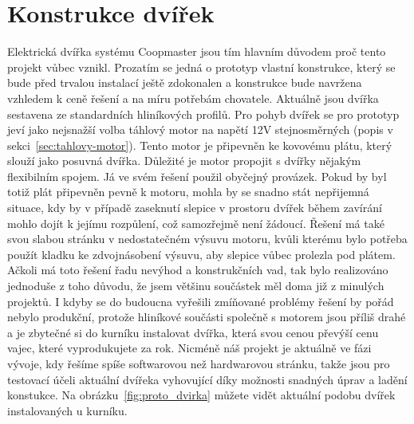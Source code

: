 \section{Konstrukce dvířek}\label{sec:konstrukce-dvirek}
Elektrická dvířka systému Coopmaster jsou tím hlavním důvodem proč tento projekt vůbec vznikl.
Prozatím se jedná o prototyp vlastní konstrukce, který se bude před trvalou instalací ještě zdokonalen a konstrukce bude navržena vzhledem k ceně řešení a na míru potřebám chovatele.
Aktuálně jsou dvířka sestavena ze standardních hliníkových profilů.
Pro pohyb dvířek se pro prototyp jeví jako nejsnažší volba táhlový motor na napětí 12V stejnosměrných (popis v sekci~\ref{sec:tahlovy-motor}).
Tento motor je připevněn ke kovovému plátu, který slouží jako posuvná dvířka.
Důležité je motor propojit s dvířky nějakým flexibilním spojem.
Já ve svém řešení použil obyčejný provázek.
Pokud by byl totiž plát připevněn pevně k motoru, mohla by se snadno stát nepřijemná situace, kdy by v případě zaseknutí slepice v prostoru dvířek během zavírání mohlo dojít k jejímu rozpůlení, což samozřejmě není žádoucí.
Řešení má také svou slabou stránku v nedostatečném výsuvu motoru, kvůli kterému bylo potřeba použít kladku ke zdvojnásobení výsuvu, aby slepice vůbec prolezla pod plátem.
Ačkoli má toto řešení řadu nevýhod a konstrukčních vad, tak bylo realizováno jednoduše z toho důvodu, že jsem většinu součástek měl doma již z minulých projektů.
I kdyby se do budoucna vyřešili zmíňované problémy řešení by pořád nebylo produkční, protože hliníkové součásti společně s motorem jsou příliš drahé a je zbytečné si do kurníku instalovat dvířka, která svou cenou převýší cenu vajec, které vyprodukujete za rok.
Nicméně náš projekt je aktuálně ve fázi vývoje, kdy řešíme spíše softwarovou než hardwarovou stránku, takže jsou pro testovací účeli aktuální dvířeka vyhovující díky možnosti snadných úprav a ladění konstukce.
Na obrázku~\ref{fig:proto_dvirka} můžete vidět aktuální podobu dvířek instalovaných u kurníku.

